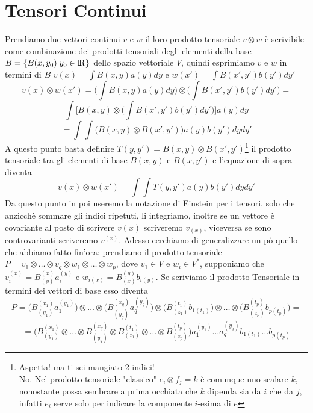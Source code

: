 \documentclass[11pt,a4paper]{report}
\theoremstyle{definition}
\theoremstyle{plain}
\theoremstyle{plain}
\begin{document}
		\section{Tensori Continui}
			Prendiamo due vettori continui $v$ e $w$ il loro prodotto tensoriale $v\otimes w$ è scrivibile come combinazione dei prodotti tensoriali degli elementi della base $B=\{B(x,y_0)|y_0\in \rm I\!R\}$ dello spazio vettoriale $V$, quindi esprimiamo $v$ e $w$ in termini di $B$ $v(x)=\int B(x,y)a(y)dy$ e $w(x')=\int B(x',y')b(y')dy'$
			\[
				v(x)\otimes w(x')=\bigg(\int B(x,y)a(y)dy \bigg)\otimes \bigg(\int B(x',y')b(y')dy'\bigg)=
			\]
			\[
				=\int \bigg[B(x,y)\otimes\bigg(\int B(x',y')b(y')dy'\bigg)\bigg]a(y)dy=
			\]
			\[
				=\int \int \bigg(B(x,y)\otimes B(x',y')\bigg)a(y)b(y')dydy'
			\]
			A questo punto basta definire $T(y,y')=B(x,y)\otimes B(x',y')$\footnote{Aspetta! ma ti sei mangiato 2 indici!\\ No. Nel prodotto tensoriale "classico" $e_i\otimes f_j=k$ è comunque uno scalare $k$, nonostante possa sembrare a prima occhiata che $k$ dipenda sia da $i$ che da $j$, infatti $e_i$ serve solo per indicare la componente $i$-esima di $e$} il prodotto tensoriale tra gli elementi di base $B(x,y)$ e $B(x,y')$ e l'equazione di sopra diventa
			\begin{equation}
				v(x)\otimes w(x')=\int \int T(y,y')a(y)b(y')dydy'
			\end{equation}
			Da questo punto in poi useremo la notazione di Einstein per i tensori, solo che anzicchè sommare gli indici ripetuti, li integriamo, inoltre se un vettore è covariante al posto di scrivere $v(x)$ scriveremo $v_{(x)}$, viceversa se sono controvarianti scriveremo $v^{(x)}$.\newline
			Adesso cerchiamo di generalizzare un pò quello che abbiamo fatto fin'ora: prendiamo il prodotto tensoriale $P=v_1\otimes\dots\otimes v_q\otimes w_1\otimes\dots\otimes w_p$, dove $v_1\in V$ e $w_i\in V^*$, supponiamo che $v_i^{(x)}=B^{(x)}_{(y)}a_i^{(y)}$ e $w_{i(x)}=B_{(x)}^{(y)}b_{i(y)}$.\newline
			Se scriviamo il prodotto Tensoriale in termini dei vettori di base esso diventa
			\[
				P=\Big(B^{(x_1)}_{(y_1)}a_1^{(y_1)}\Big)\otimes\dots\otimes\Big(B^{(x_q)}_{(y_q)}a_q^{(y_q)}\Big)\otimes\Big(B_{(z_1)}^{(t_1)}b_{1(t_1)}\Big)\otimes\dots\otimes\Big(B_{(z_p)}^{(t_p)}b_{p(t_p)}\Big)=
			\]
			\[
				=\Big(B^{(x_1)}_{(y_1)}\otimes\dots\otimes B^{(x_q)}_{(y_q)}\otimes B_{(z_1)}^{(t_1)}\otimes\dots\otimes B_{(z_p)}^{(t_p)}\Big)a_1^{(y_1)}\dots a_q^{(y_q)}b_{1(t_1)}\dots b_{p(t_p)}
			\]
\end{document}
